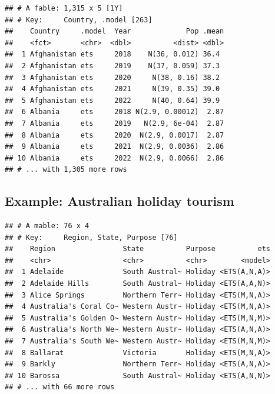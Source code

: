 \documentclass[]{book}
\newenvironment{Shaded}{\begin{snugshade}}{\end{snugshade}}
\newcommand{\DataTypeTok}[1]{\textcolor[rgb]{0.13,0.29,0.53}{#1}}
\newcommand{\KeywordTok}[1]{\textcolor[rgb]{0.13,0.29,0.53}{\textbf{#1}}}
\newcommand{\NormalTok}[1]{#1}
\newcommand{\OperatorTok}[1]{\textcolor[rgb]{0.81,0.36,0.00}{\textbf{#1}}}
\newcommand{\StringTok}[1]{\textcolor[rgb]{0.31,0.60,0.02}{#1}}
\begin{document}
\begin{verbatim}
## # A fable: 1,315 x 5 [1Y]
## # Key:     Country, .model [263]
##    Country     .model  Year             Pop .mean
##    <fct>       <chr>  <dbl>          <dist> <dbl>
##  1 Afghanistan ets     2018    N(36, 0.012) 36.4 
##  2 Afghanistan ets     2019    N(37, 0.059) 37.3 
##  3 Afghanistan ets     2020     N(38, 0.16) 38.2 
##  4 Afghanistan ets     2021     N(39, 0.35) 39.0 
##  5 Afghanistan ets     2022     N(40, 0.64) 39.9 
##  6 Albania     ets     2018 N(2.9, 0.00012)  2.87
##  7 Albania     ets     2019   N(2.9, 6e-04)  2.87
##  8 Albania     ets     2020  N(2.9, 0.0017)  2.87
##  9 Albania     ets     2021  N(2.9, 0.0036)  2.86
## 10 Albania     ets     2022  N(2.9, 0.0066)  2.86
## # ... with 1,305 more rows
\end{verbatim}

\hypertarget{example-australian-holiday-tourism-1}{%
\subsection{Example: Australian holiday tourism}\label{example-australian-holiday-tourism-1}}

\begin{Shaded}
\end{Shaded}

\begin{verbatim}
## # A mable: 76 x 4
## # Key:     Region, State, Purpose [76]
##    Region                State          Purpose          ets
##    <chr>                 <chr>          <chr>        <model>
##  1 Adelaide              South Austral~ Holiday <ETS(A,N,A)>
##  2 Adelaide Hills        South Austral~ Holiday <ETS(A,A,N)>
##  3 Alice Springs         Northern Terr~ Holiday <ETS(M,N,A)>
##  4 Australia's Coral Co~ Western Austr~ Holiday <ETS(M,N,A)>
##  5 Australia's Golden O~ Western Austr~ Holiday <ETS(M,N,M)>
##  6 Australia's North We~ Western Austr~ Holiday <ETS(A,N,A)>
##  7 Australia's South We~ Western Austr~ Holiday <ETS(M,N,M)>
##  8 Ballarat              Victoria       Holiday <ETS(M,N,A)>
##  9 Barkly                Northern Terr~ Holiday <ETS(A,N,A)>
## 10 Barossa               South Austral~ Holiday <ETS(A,N,N)>
## # ... with 66 more rows
\end{verbatim}
\end{document}
